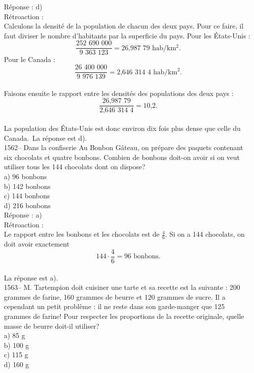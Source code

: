 R\'eponse : d)\\

R\'etroaction :\\
Calculons la densit\'e de la population de chacun des deux pays.
Pour ce faire, il faut diviser le nombre d'habitants par la
superficie du pays. \vskip 10pt Pour les \'Etats-Unis
:$$\frac{\textrm{252 690 000}}{\textrm{9 363 123}} ={\textrm{26,987
79}} {\textrm{ hab/km$^2$.}}$$ \vskip 10pt Pour le Canada
:$$\frac{\textrm{26 400 000}}{\textrm{9 976 139}}={\textrm{2,646 314
4}} {\textrm{ hab/km$^2$.}}$$\\

Faisons ensuite le rapport entre les densit\'es des populations des
deux pays :
$$\frac{\textrm{26,987 79}}{\textrm{2,646 314
4}}={\textrm{10,2.}}$$\\
La population des \'Etats-Unis est donc environ dix fois plus
dense que celle du Canada.\, La r\'eponse est d).\\


1562-- Dans la confiserie Au Bonbon G\^ateau, on pr\'epare des
paquets contenant six chocolats et quatre bonbons. Combien de
bonbons doit-on avoir si on veut utiliser tous les 144 chocolats
dont on dispose? \\
a) 96 bonbons\\
b) 142 bonbons\\
c) 144 bonbons\\
d) 216 bonbons\\

R\'eponse : a)\\

R\'etroaction :\\
Le rapport entre les bonbons et les chocolats est de $\frac{4}{6}$.
Si on a 144 chocolats, on doit avoir exactement
$$144\cdot\frac{4}{6}={\textrm{96 bonbons.}}$$\\ La r\'eponse est a).\\

1563-- M. Tartempion doit cuisiner une tarte et sa recette est la
suivante : 200 grammes de farine, 160 grammes de beurre et 120
grammes de sucre. Il a cependant un petit probl\`eme : il ne reste
dans son garde-manger que 125 grammes de farine! Pour respecter les
proportions de la recette originale,
quelle masse de beurre doit-il utiliser?\\
a) 85 g\\
b) 100 g\\
c) 115 g\\
d) 160 g\\

